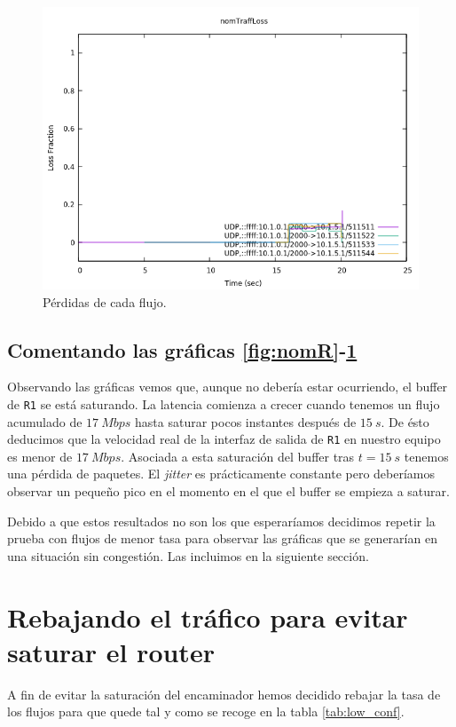 \documentclass[11pt]{article}
\begin{document}
        \begin{figure}
            \centering
            \includegraphics[width=0.6\linewidth]{nomTraffLoss.png}
            \caption{Pérdidas de cada flujo.}
            \label{fig:nomLoss}
        \end{figure}

        \subsection{Comentando las gráficas \ref{fig:nomR}-\ref{fig:nomLoss}}
            Observando las gráficas vemos que, aunque no debería estar ocurriendo, el buffer de \texttt{R1} se está saturando. La latencia comienza a crecer cuando tenemos un flujo acumulado de $17\ Mbps$ hasta saturar pocos instantes después de $15\ s$. De ésto deducimos que la velocidad real de la interfaz de salida de \texttt{R1} en nuestro equipo es menor de $17\ Mbps$. Asociada a esta saturación del buffer tras $t = 15\ s$ tenemos una pérdida de paquetes. El \textit{jitter} es prácticamente constante pero deberíamos observar un pequeño pico en el momento en el que el buffer se empieza a saturar.

            Debido a que estos resultados no son los que esperaríamos decidimos repetir la prueba con flujos de menor tasa para observar las gráficas que se generarían en una situación sin congestión. Las incluimos en la siguiente sección.

    \section{Rebajando el tráfico para evitar saturar el router}
        A fin de evitar la saturación del encaminador hemos decidido rebajar la tasa de los flujos para que quede tal y como se recoge en la tabla \ref{tab:low_conf}.
\end{document}
